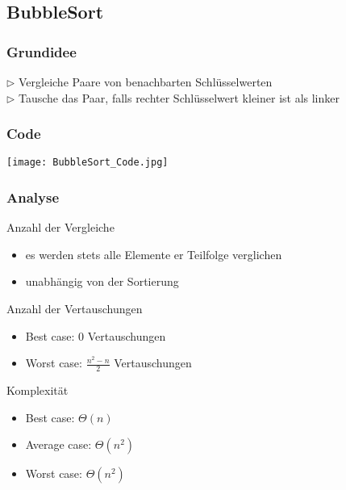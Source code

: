 				
		
		
	\subsection{BubbleSort}
		\begin{minipage}[t]{0.5\textwidth}
			\subsubsection{Grundidee}
				$\rhd$ Vergleiche Paare von benachbarten Schlüsselwerten \\
				$\rhd$ Tausche das Paar, falls rechter Schlüsselwert kleiner ist als linker
		\end{minipage}
		\begin{minipage}[t]{0.45\textwidth}
			\subsubsection{Code}
				\begin{center}
					\texttt{[image: BubbleSort\_Code.jpg]}
				\end{center}
		\end{minipage}
				
		\subsubsection{Analyse}
			Anzahl der Vergleiche
			\begin{itemize}
				\item es werden stets alle Elemente er Teilfolge verglichen
				\item unabhängig von der Sortierung
			\end{itemize}
			Anzahl der Vertauschungen
			\begin{itemize}
				\item Best case: 0 Vertauschungen
				\item Worst case: $\frac{n^2 - n}{2}$ Vertauschungen
			\end{itemize}
			Komplexität
			\begin{itemize}
				\item Best case: $\Theta (n)$
				\item Average case: $\Theta (n^2)$
				\item Worst case: $\Theta (n^2)$
			\end{itemize}
			\vspace{1.5cm}
		
